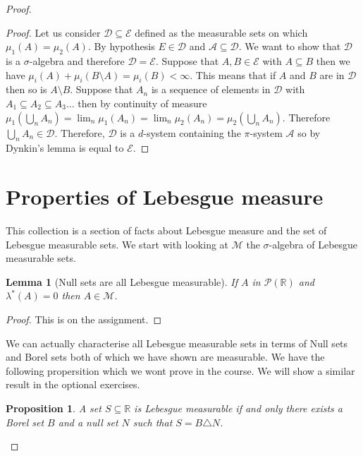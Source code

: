 \documentclass[
]{book}
\newtheorem{lemma}{Lemma}[chapter]
\newtheorem{proposition}{Proposition}[chapter]
\theoremstyle{definition}
\theoremstyle{definition}
\theoremstyle{definition}
\theoremstyle{definition}
\theoremstyle{remark}
\begin{document}
\begin{proof}
\begin{proof}
Let us consider \(\mathcal{D} \subseteq \mathcal{E}\) defined as the measurable sets on which \(\mu_1(A) = \mu_2(A)\). By hypothesis \(E \in \mathcal{D}\) and \(\mathcal{A} \subseteq \mathcal{D}\). We want to show that \(\mathcal{D}\) is a \(\sigma\)-algebra and therefore \(\mathcal{D} = \mathcal{E}\). Suppose that \(A, B \in \mathcal{E}\) with \(A \subseteq B\) then we have \(\mu_i(A) + \mu_i (B \setminus A) = \mu_i(B) < \infty.\) This means that if \(A\) and \(B\) are in \(\mathcal{D}\) then so is \(A \setminus B\). Suppose that \(A_n\) is a sequence of elements in \(\mathcal{D}\) with \(A_1 \subseteq A_2 \subseteq A_3 \dots\) then by continuity of measure \(\mu_1(\bigcup_n A_n) = \lim_n \mu_1(A_n) = \lim_n \mu_2(A_n) = \mu_2(\bigcup_n A_n)\). Therefore \(\bigcup_n A_n \in \mathcal{D}\). Therefore, \(\mathcal{D}\) is a \(d\)-system containing the \(\pi\)-system \(\mathcal{A}\) so by Dynkin's lemma is equal to \(\mathcal{E}\).
\end{proof}

\hypertarget{properties-of-lebesgue-measure}{%
\section{Properties of Lebesgue measure}\label{properties-of-lebesgue-measure}}

This collection is a section of facts about Lebesgue measure and the set of Lebesgue measurable sets. We start with looking at \(\mathscr{M}\) the \(\sigma\)-algebra of Lebesgue measurable sets.

\begin{lemma}[Null sets are all Lebesgue measurable]
If \(A\) in \(\mathscr{P}(\mathbb{R})\) and \(\lambda^*(A) =0\) then \(A \in \mathscr{M}\).
\end{lemma}

\begin{proof}
This is on the assignment.
\end{proof}

We can actually characterise all Lebesgue measurable sets in terms of Null sets and Borel sets both of which we have shown are measurable. We have the following propersition which we wont prove in the course. We will show a similar result in the optional exercises.

\begin{proposition}
A set \(S \subseteq \mathbb{R}\) is Lebesgue measurable if and only there exists a Borel set \(B\) and a null set \(N\) such that \(S = B \triangle N\).
\end{proposition}


\end{proof}
\end{document}
